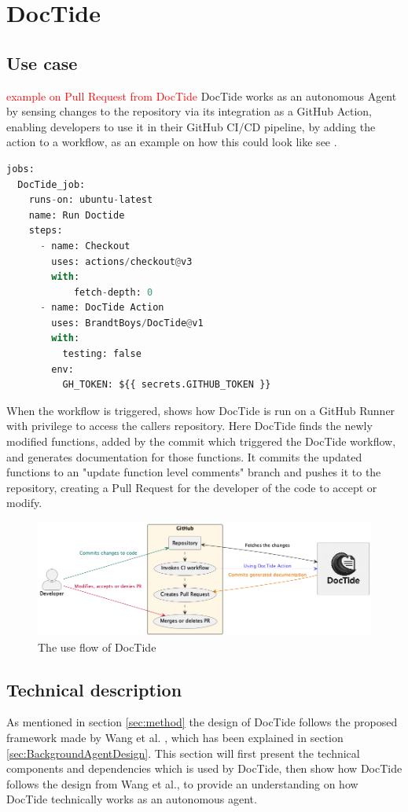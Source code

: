 \section{DocTide}
\label{sec:DesignDocTide}
\subsection{Use case}
\textcolor{red}{example on Pull Request from DocTide }
DocTide works as an autonomous Agent by sensing changes to the repository via its integration as a GitHub Action, enabling developers to use it in their GitHub CI/CD pipeline, by adding the action to a workflow, as an example on how this could look like see .
\begin{lstlisting}[language=Python, label={lst:flow}, caption=Example on how to use DocTide in a workflow]
jobs:
  DocTide_job:
    runs-on: ubuntu-latest
    name: Run Doctide
    steps:
      - name: Checkout
        uses: actions/checkout@v3
        with:
            fetch-depth: 0
      - name: DocTide Action
        uses: BrandtBoys/DocTide@v1
        with:
          testing: false
        env:
          GH_TOKEN: ${{ secrets.GITHUB_TOKEN }}
\end{lstlisting}
When the workflow is triggered,  shows how DocTide is run on a GitHub Runner with privilege to access the callers repository. Here DocTide finds the newly modified functions, added by the commit which triggered the DocTide workflow, and generates documentation for those functions. It commits the updated functions to an "update function level comments" branch and pushes it to the repository, creating a Pull Request for the developer of the code to accept or modify.
\begin{figure}[H]
\centering
\includegraphics[width=1\linewidth]{Figures/doctide_flow.png}
\caption{The use flow of DocTide}
\label{fig:flow_doctide}
\end{figure}
\subsection{Technical description}
As mentioned in section \ref{sec:method} the design of DocTide follows the proposed framework made by Wang et al. \cite{wang2024survey}, which has been explained in section \ref{sec:BackgroundAgentDesign}. This section will first present the technical components and dependencies which is used by DocTide, then show how DocTide follows the design from Wang et al., to provide an understanding on how DocTide technically works as an autonomous agent.

